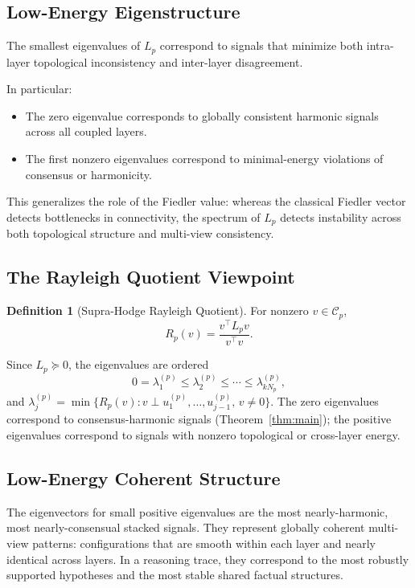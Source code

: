 \documentclass[11pt]{article}
\theoremstyle{definition}
\newtheorem{definition}[theorem]{Definition}
\theoremstyle{remark}
\newcommand{\Rp}{R_p}
\newcommand{\calC}{\mathcal{C}}
\begin{document}
\subsection{Low-Energy Eigenstructure}

The smallest eigenvalues of $L_p$ correspond to signals that minimize both intra-layer topological inconsistency and inter-layer disagreement.

In particular:
\begin{itemize}
\item The zero eigenvalue corresponds to globally consistent harmonic signals across all coupled layers.
\item The first nonzero eigenvalues correspond to minimal-energy violations of consensus or harmonicity.
\end{itemize}

This generalizes the role of the Fiedler value: whereas the classical Fiedler vector detects bottlenecks in connectivity, the spectrum of $L_p$ detects instability across both topological structure and multi-view consistency.

\subsection{The Rayleigh Quotient Viewpoint}

\begin{definition}[Supra-Hodge Rayleigh Quotient]
For nonzero $v\in\calC_p$,
\[
  \Rp(v) = \frac{v^\top L_p v}{v^\top v}.
\]
\end{definition}

Since $L_p\succeq 0$, the eigenvalues are ordered
\[
  0 = \lambda_1^{(p)} \leq \lambda_2^{(p)} \leq \cdots \leq \lambda_{kN_p}^{(p)},
\]
and $\lambda_j^{(p)} = \min\{\Rp(v) : v\perp u_1^{(p)},\dots,u_{j-1}^{(p)},\, v\neq 0\}$.
The zero eigenvalues correspond to consensus-harmonic signals
(Theorem~\ref{thm:main}); the positive eigenvalues correspond to signals with
nonzero topological or cross-layer energy.

\subsection{Low-Energy Coherent Structure}

The eigenvectors for small positive eigenvalues are the most nearly-harmonic,
most nearly-consensual stacked signals. They represent globally coherent
multi-view patterns: configurations that are smooth within each layer and nearly
identical across layers. In a reasoning trace, they correspond to the most
robustly supported hypotheses and the most stable shared factual structures.
\end{document}
